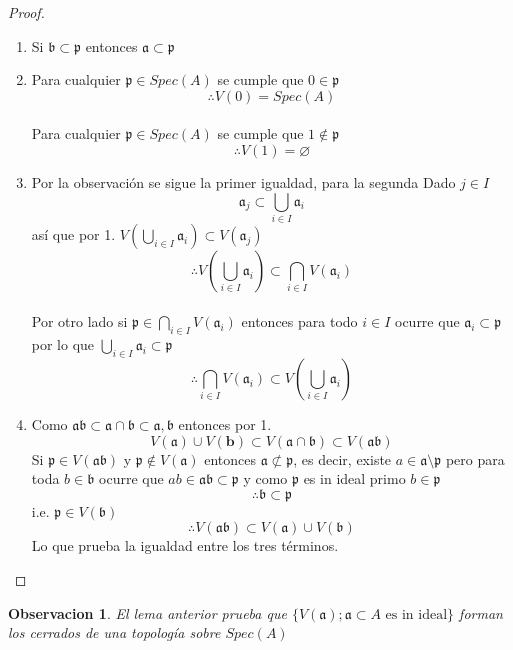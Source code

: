 \documentclass{article}
\newtheorem{observacion}{Observacion}
\begin{document}
\begin{proof}
    \begin{enumerate}
        \item Si $\mathfrak{b} \subset \mathfrak{p}$ entonces $\mathfrak{a} \subset \mathfrak{p}$
    
        \item Para cualquier $\mathfrak{p} \in Spec(A)$ se cumple que $0 \in \mathfrak{p}$
        $$\therefore V(0)=Spec(A)$$
        \\
        Para cualquier $\mathfrak{p} \in Spec(A)$ se cumple que $1 \notin \mathfrak{p}$
        $$\therefore V(1)=\varnothing$$

        \item Por la observación se sigue la primer igualdad, para la segunda 
        Dado $j\in I $ 
        $$\mathfrak{a}_j \subset \bigcup_{i\in I} \mathfrak{a}_i$$ así que por 1.
        $V(\bigcup_{i\in I}\mathfrak{a}_i) \subset V(\mathfrak{a}_j)$
        $$\therefore V(\bigcup_{i\in I}\mathfrak{a}_i) \subset \bigcap_{i \in I} V(\mathfrak{a}_i)$$
        \\
        Por otro lado si $\mathfrak{p} \in \bigcap_{i \in I} V(\mathfrak{a}_i)$ entonces
        para todo $i\in I$ ocurre que $\mathfrak{a}_i \subset \mathfrak{p}$\\
        por lo que $\bigcup_{i\in I} \mathfrak{a}_i \subset \mathfrak{p}$
        $$\therefore \bigcap_{i \in I} V(\mathfrak{a}_i) \subset V(\bigcup_{i\in I}\mathfrak{a}_i)$$

        
        \item Como $\mathfrak{a} \mathfrak{b} \subset \mathfrak{a}\cap \mathfrak{b}\subset \mathfrak{a}, \mathfrak{b}$ entonces por 1.
        $$V(\mathfrak{a}) \cup V(\mathbf{b}) \subset V(\mathfrak{a}\cap \mathfrak{b}) \subset V(\mathfrak{a} \mathfrak{b})$$
        Si $\mathfrak{p} \in V(\mathfrak{a} \mathfrak{b})$ y $\mathfrak{p}\notin V(\mathfrak{a})$ entonces $\mathfrak{a} \not\subset \mathfrak{p}$,
        es decir, existe $a\in \mathfrak{a} \setminus \mathfrak{p}$ pero para toda $b \in \mathfrak{b}$ ocurre que
        $ab \in \mathfrak{a} \mathfrak{b} \subset \mathfrak{p}$ y como $\mathfrak{p}$ es in ideal primo $b \in \mathfrak{p}$
        $$\therefore \mathfrak{b} \subset \mathfrak{p}$$ i.e. $\mathfrak{p} \in V(\mathfrak{b})$
        $$\therefore V(\mathfrak{a} \mathfrak{b}) \subset V(\mathfrak{a}) \cup V(\mathfrak{b})$$
        Lo que prueba la igualdad entre los tres términos.
    \end{enumerate}
\end{proof}

\begin{observacion}
    El lema anterior prueba que $\{V(\mathfrak{a}); \mathfrak{a} \subset A \mbox{ es in ideal}\}$
    forman los cerrados de una topología sobre $Spec(A)$
\end{observacion}
\end{document}
